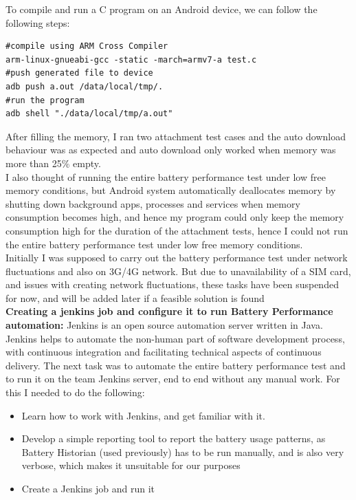 \documentclass[a4paper,12pt]{article}
\begin{document}
To compile and run a C program on an Android device, we can follow the following steps:
\begin{lstlisting}[style=ShellStyle]
#compile using ARM Cross Compiler
arm-linux-gnueabi-gcc -static -march=armv7-a test.c 
#push generated file to device
adb push a.out /data/local/tmp/.
#run the program
adb shell "./data/local/tmp/a.out"  
\end{lstlisting}
After filling the memory, I ran two attachment test cases and the auto download behaviour was as expected and auto download only worked when memory was more than 25\% empty.\\

I also thought of running the entire battery performance test under low free memory conditions, but Android system automatically deallocates memory by shutting down background apps, processes and services when memory consumption becomes high, and hence my program could only keep the memory consumption high for the duration of the attachment tests, hence I could not run the entire battery performance test under low free memory conditions. \\

Initially I was supposed to carry out the battery performance test under network fluctuations and also on 3G/4G network. But due to unavailability of a SIM card, and issues with creating network fluctuations, these tasks have been suspended for now, and will be added later if a feasible solution is found\\

\textbf{Creating a jenkins job and configure it to run Battery Performance automation: }Jenkins is an open source automation server written in Java. Jenkins helps to automate the non-human part of software development process, with continuous integration and facilitating technical aspects of continuous delivery. The next task was to automate the entire battery performance test and to run it on the team Jenkins server, end to end without any manual work. For this I needed to do the following:
\begin{itemize}
	\item Learn how to work with Jenkins, and get familiar with it.
	\item Develop a simple reporting tool to report the battery usage patterns, as Battery Historian (used previously) has to be run manually, and is also very verbose, which makes it unsuitable for our purposes
	\item Create a Jenkins job and run it
\end{itemize}
\end{document}
